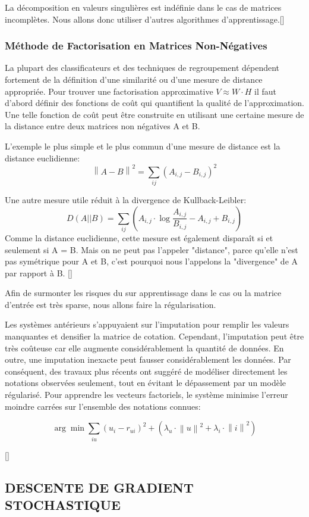 La décomposition en valeurs singulières est indéfinie dans le cas de matrices incomplètes. Nous allons donc utiliser d\/’autres algorithmes d\/'apprentissage.[\cite{}]

\subsubsection{Méthode de Factorisation en Matrices Non-Négatives}


La plupart des classificateurs et des techniques de regroupement dépendent fortement de la définition d'une similarité ou d'une mesure de distance appropriée. Pour trouver une factorisation approximative $V \approx W\cdot H$ il faut d'abord définir des fonctions de coût qui quantifient la qualité de l'approximation. Une telle fonction de coût peut être construite en utilisant une certaine mesure de la distance entre deux matrices non négatives A et B. 

L'exemple le plus simple et le plus commun d'une mesure de distance est la distance euclidienne: 
\[ \left \| A - B \right \|^{2} = \sum_{ij}(A_{i,j} - B_{i,j} )^{2}  \]

Une autre mesure utile réduit à la divergence de Kullback-Leibler:
\[ D(A||B) = \sum_{ij}(A_{i,j}\cdot \log\frac{A_{i,j}}{B_{i,j}} - A_{i,j} + B_{i,j} ) \]
Comme la distance euclidienne, cette mesure est également disparaît si et seulement si A = B. Mais on ne peut pas l'appeler "distance", parce qu'elle n'est pas symétrique pour A et B, c'est pourquoi nous l'appelons la "divergence" de A par rapport à B. [\cite{lee2001algorithms}]

Afin de surmonter les risques du sur apprentissage dans le cas ou la matrice d\/’entrée est très sparse, nous allons faire la régularisation.

Les systèmes antérieurs s'appuyaient sur l'imputation pour remplir les valeurs manquantes et densifier la matrice de cotation.  Cependant, l'imputation peut être très coûteuse car elle augmente considérablement la quantité de données. En outre, une imputation inexacte peut fausser considérablement les données. Par conséquent, des travaux plus récents ont suggéré de modéliser directement les notations observées seulement, tout en évitant le dépassement par un modèle régularisé. Pour apprendre les vecteurs factoriels, le système minimise l'erreur moindre carrées sur l'ensemble des notations connues:

\[\arg\min \sum_{iu} (u_i - r_{ui})^{2} + (\lambda_u\cdot \left \| u \right \| ^{2} + \lambda_i\cdot \left \| i \right \| ^{2})\]

[\cite{bell2008bellkor}]

\subsection{DESCENTE DE GRADIENT STOCHASTIQUE}








